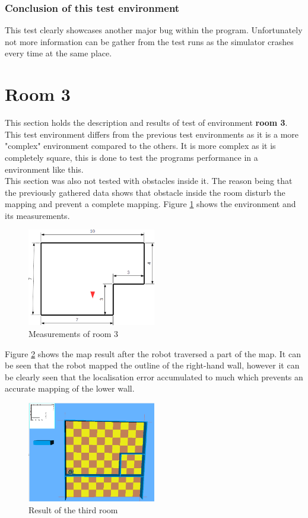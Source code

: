 \subsubsection{Conclusion of this test environment}
This test clearly showcases another major bug within the program. Unfortunately not more information can be gather from the test runs as the simulator crashes every time at the same place.

\section{Room 3}
This section holds the description and results of test of environment \textbf{room 3}. \\
This test environment differs from the previous test environments as it is a more "complex" environment compared to the others. It is more complex as it is completely square, this is done to test the programs performance in a environment like this.\\
This section was also not tested with obstacles inside it. The reason being that the previously gathered data shows that obstacle inside the room disturb the mapping and prevent a complete mapping.
Figure \ref{room3_empty} shows the environment and its measurements. \\

\begin{figure}[h]
\centering
\includegraphics[width = 0.5\textwidth]{../../figures/room3_empty}
\caption{Measurements of room 3}
\label{room3_empty}
\end{figure}

Figure \ref{room3_result1} shows the map result after the robot traversed a part of the map. It can be seen that the robot mapped the outline of the right-hand wall, however it can be clearly seen that the localisation error accumulated to much which prevents an accurate mapping of the lower wall. \\

\begin{figure}[h]
\centering
\includegraphics[width = 0.5\textwidth]{../../figures/map_results/room4_result1.png}
\caption{Result of the third room}
\label{room3_result1}
\end{figure}


